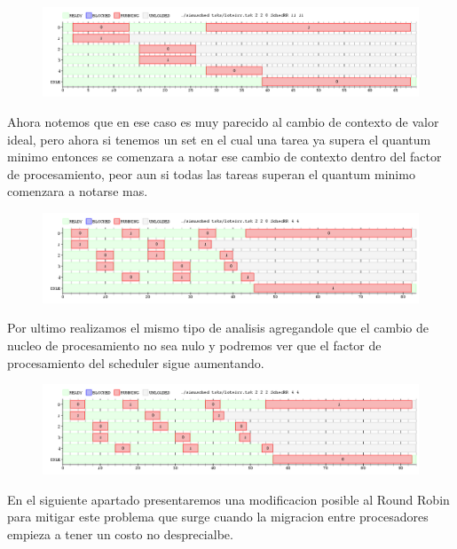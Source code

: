 \\
\begin{figure}[H]
  \centering
\includegraphics[scale=0.45]{graficos/parte2/rr/5.png}
  \caption[Caption for LOF]{}
\end{figure}
Ahora notemos que en ese caso es muy parecido al cambio de contexto de valor ideal, pero ahora si tenemos un set en el cual una tarea ya supera el quantum minimo entonces se comenzara a notar ese cambio de contexto dentro del factor de procesamiento, peor aun si todas las tareas superan el quantum minimo comenzara a notarse mas.
\\
\begin{figure}[H]
  \centering
\includegraphics[scale=0.45]{graficos/parte2/rr/6.png}
  \caption[Caption for LOF]{}
\end{figure}
Por ultimo realizamos el mismo tipo de analisis agregandole que el cambio de nucleo de procesamiento no sea nulo y podremos ver que el factor de procesamiento del scheduler sigue aumentando.
\begin{figure}[H]
  \centering
\includegraphics[scale=0.45]{graficos/parte2/rr/7.png}
  \caption[Caption for LOF]{}
\end{figure}
En el siguiente apartado presentaremos una modificacion posible al Round Robin para mitigar este problema que surge cuando la migracion entre procesadores empieza a tener un costo no desprecialbe.
